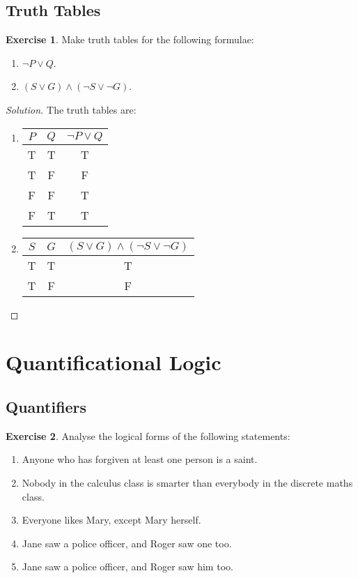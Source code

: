 \documentclass[headings=standardclasses]{scrartcl}
\theoremstyle{definition}
\newtheorem{exercise}{Exercise}[subsection]
\newenvironment{solution}{\begin{proof}[Solution]}{\end{proof}}
\begin{document}
\subsection{Truth Tables}

\begin{exercise}
  Make truth tables for the following formulae:
  \begin{enumerate}
    \item \(\lnot P \lor Q\).
    \item \((S \lor G) \land (\lnot S \lor \lnot G)\).
  \end{enumerate}
\end{exercise}

\begin{solution}
  The truth tables are:
  \begin{enumerate}
    \item
      \begin{tabular}[b]{ccc}
        \toprule
        \(P\) & \(Q\) & \(\lnot P \lor Q\) \\
        \midrule
        T & T & T \\
        T & F & F \\
        F & F & T \\
        F & T & T \\
        \bottomrule
      \end{tabular}
    \item
      \begin{tabular}[b]{ccc}
        \toprule
        \(S\) & \(G\) & \((S \lor G) \land (\lnot S \lor \lnot G)\) \\
        \midrule
        T & T & T \\
        T & F & F \\
        \bottomrule
      \end{tabular} \qedhere
  \end{enumerate}
\end{solution}

\section{Quantificational Logic}

\subsection{Quantifiers}

\begin{exercise}
  Analyse the logical forms of the following statements:
  \begin{enumerate}
    \item Anyone who has forgiven at least one person is a saint.
    \item Nobody in the calculus class is smarter than everybody in the
          discrete maths class.
    \item Everyone likes Mary, except Mary herself.
    \item Jane saw a police officer, and Roger saw one too.
    \item Jane saw a police officer, and Roger saw him too.
  \end{enumerate}
\end{exercise}
\end{document}
